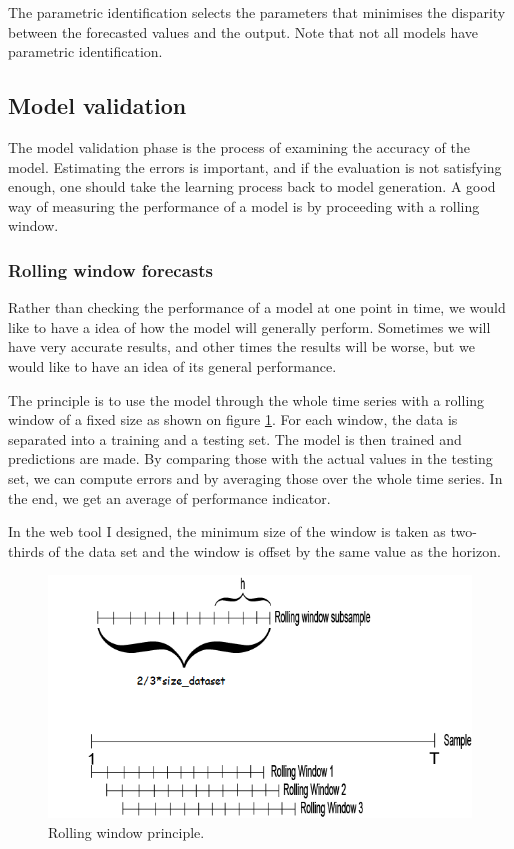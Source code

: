 \documentclass[11pt,a4paper,oneside]{book}
\begin{document}
The parametric identification selects the parameters that minimises the disparity between the forecasted values and the output. Note that not all models have parametric identification. \cite{BenTaieb}


\subsection{Model validation}

The model validation phase is the process of examining the accuracy of the model. Estimating the errors is important, and if the evaluation is not satisfying enough, one should take the learning process back to model generation. A good way of measuring the performance of a model is by proceeding with a rolling window. \cite{BenTaieb}


\subsubsection{Rolling window forecasts}


Rather than checking the performance of a model at one point in time, we would like to have a idea of how the model will generally perform. Sometimes we will have very accurate results, and other times the results will be worse, but we would like to have an idea of its general performance.

The principle is to use the model through the whole time series with a rolling window of a fixed size as shown on figure \ref{fig:rolling}. For each window, the data is separated into a training and a testing set. The model is then trained and predictions are made. By comparing those with the actual values in the testing set, we can compute errors and by averaging those over the whole time series. In the end, we get an average of performance indicator.

In the web tool I designed, the minimum size of the window is taken as two-thirds of the data set and the window is offset by the same value as the horizon.


\begin{figure}[!h]
  \centering
    \includegraphics[scale=0.95]{img/rollingwindow.png}
  \caption{Rolling window principle\cite{rolling}.}
  \label{fig:rolling}
\end{figure}
\end{document}
